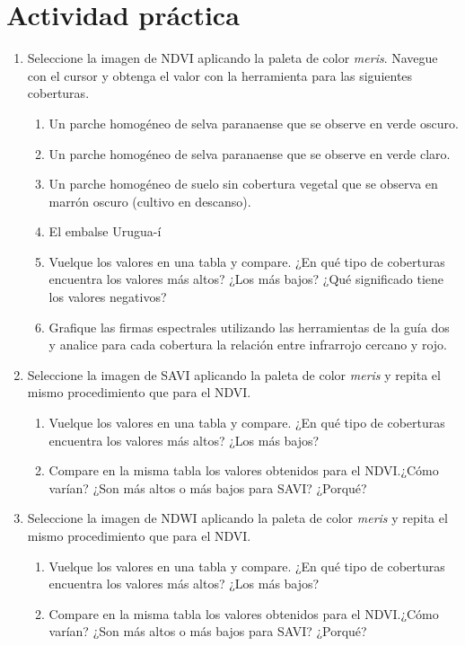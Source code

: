 \section{Actividad práctica}
\begin{enumerate}
  \item Seleccione la imagen de NDVI aplicando la paleta de color \emph{meris}. Navegue con el cursor y obtenga el valor con la herramienta  para las siguientes coberturas.
  \begin{enumerate}

    \item Un parche homogéneo de selva paranaense que se observe en verde oscuro.
    \item Un parche homogéneo de selva paranaense que se observe en verde claro.
    \item Un parche homogéneo de suelo sin cobertura vegetal que se observa en marrón oscuro (cultivo en descanso).
    \item El embalse Urugua-í
    \item Vuelque los valores en una tabla y compare. ¿En qué tipo de coberturas encuentra los valores más altos? ¿Los más bajos? ¿Qué significado tiene los valores negativos?
    \item Grafique las firmas espectrales utilizando las herramientas de la guía dos y analice para cada cobertura la relación entre infrarrojo cercano y rojo.
  \end{enumerate}


  \item Seleccione la imagen de SAVI aplicando la paleta de color \emph{meris} y repita el mismo procedimiento que para el NDVI.
  \begin{enumerate}
   \item Vuelque los valores en una tabla y compare. ¿En qué tipo de coberturas encuentra los valores más altos? ¿Los más bajos?
   \item Compare en la misma tabla los valores obtenidos para el NDVI.¿Cómo varían? ¿Son más altos o más bajos para SAVI? ¿Porqué?
 \end{enumerate}

\item Seleccione la imagen de NDWI aplicando la paleta de color \emph{meris} y repita el mismo procedimiento que para el NDVI.
  \begin{enumerate}
   \item Vuelque los valores en una tabla y compare. ¿En qué tipo de coberturas encuentra los valores más altos? ¿Los más bajos?
   \item Compare en la misma tabla los valores obtenidos para el NDVI.¿Cómo varían? ¿Son más altos o más bajos para SAVI? ¿Porqué?
  \end{enumerate}
\end{enumerate}

